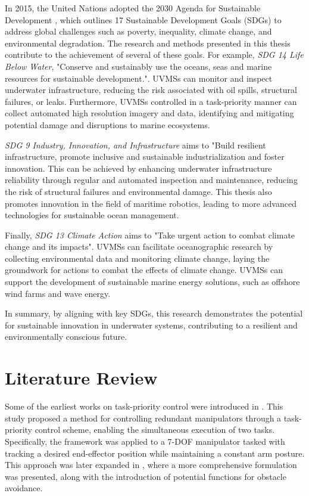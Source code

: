 In 2015, the United Nations adopted the 2030 Agenda for Sustainable Development
\cite{UN2030Agenda}, which outlines 17 Sustainable Development Goals (SDGs) to
address global challenges such as poverty, inequality, climate change, and
environmental degradation. The research and methods presented in this thesis
contribute to the achievement of several of these goals. For example, \emph{SDG 14
Life Below Water}, "Conserve and sustainably use the oceans, seas and marine
resources for sustainable development.". UVMSs can monitor and inspect underwater
infrastructure, reducing the risk associated with oil spills, structural failures,
or leaks. Furthermore, UVMSs controlled in a task-priority manner can collect automated
high resolution imagery and data, identifying and mitigating potential
damage and disruptions to marine ecosystems.

\emph{SDG 9 Industry, Innovation, and Infrastructure} aims to "Build resilient
infrastructure, promote inclusive and sustainable industrialization and foster
innovation. This can be achieved by enhancing underwater infrastructure reliability
through regular and automated inspection and maintenance, reducing the risk of
structural failures and environmental damage. This thesis also promotes innovation
in the field of maritime robotics, leading to more advanced technologies for
sustainable ocean management.

Finally, \emph{SDG 13 Climate Action} aims to "Take urgent action to combat climate
change and its impacts". UVMSs can facilitate oceanographic research by collecting
environmental data and monitoring climate change, laying the groundwork for actions
to combat the effects of climate change. UVMSs can support the development of
sustainable marine energy solutions, such as offshore wind farms and wave energy.

In summary, by aligning with key SDGs, this research demonstrates the potential
for sustainable innovation in underwater systems, contributing to a resilient 
and environmentally conscious future.

\section{Literature Review}

Some of the earliest works on task-priority control were introduced in 
\cite{hanafusa1981}. This study proposed a method for controlling redundant 
manipulators through a task-priority control scheme, enabling the simultaneous 
execution of two tasks. Specifically, the framework was applied to a 7-DOF 
manipulator tasked with tracking a desired end-effector position while 
maintaining a constant arm posture. This approach was later expanded in 
\cite{nakamura1987}, where a more comprehensive formulation was presented, 
along with the introduction of potential functions for obstacle avoidance.

